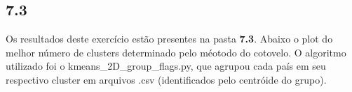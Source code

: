 \begin{figure}[ht!]
	\vspace{-3mm}	%
	\begin{center}
	\end{center}
	\vspace{-3mm}	%
	\label{ex6_fig1}
\end{figure}


\clearpage
\subsection*{7.3}
%

Os resultados deste exercício estão presentes na pasta \textbf{7.3}. Abaixo o plot do melhor número de clusters determinado pelo méotodo do cotovelo. O algoritmo utilizado foi o kmeans\_2D\_group\_flags.py, que agrupou cada país em seu respectivo cluster em arquivos .csv (identificados pelo centróide do grupo).

